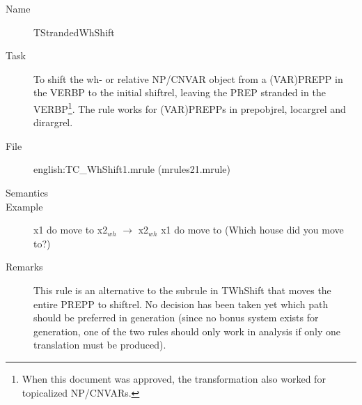 \begin{description}
\vspace{1 cm}
\begin{description}
\item[Name] TStrandedWhShift
\item[Task] To shift the wh- or relative NP/CNVAR object from a (VAR)PREPP in 
the VERBP
to the initial shiftrel, leaving the PREP stranded in the 
VERBP\footnote{When this document was 
approved, the transformation also worked for topicalized NP/CNVARs.}.
The rule works 
for (VAR)PREPPs in prepobjrel, locargrel and dirargrel.
\item[File] english:TC\_WhShift1.mrule (mrules21.mrule)
\item[Semantics]
\item[Example] x1 do move to x2$_{wh}$ $\rightarrow$ x2$_{wh}$ x1 do move to 
(Which house did you move to?)
\item[Remarks] This rule is an alternative to the subrule in TWhShift that 
moves the entire PREPP to shiftrel. No decision has been taken yet which path 
should be preferred in generation (since no bonus system exists for generation, 
one of the two rules should only work in analysis if only one translation must 
be produced).
\end{description}

\end{description}

\newpage
